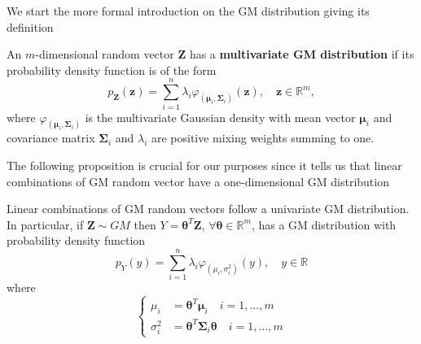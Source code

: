 We start the more formal introduction on the GM distribution giving its definition
\begin{definition}[GM distribution]
	An $m$-dimensional random vector $\bm{Z}$ has a \textbf{multivariate GM distribution} if its probability density function is of the form
	\[ p_{\bm{Z}}(\bm{z}) = \sum_{i=1}^{n} \lambda_i \varphi_{(\bm{\mu}_i,\bm{\Sigma}_i)}(\bm{z}), \quad \bm{z} \in \mathbb{R}^m, \] 
	where $\varphi_{(\bm{\mu}_i,\bm{\Sigma}_i)}$ is the multivariate Gaussian density with mean vector $\bm{\mu}_i$ and covariance matrix $\bm{\Sigma}_i$ and $\lambda_i$ are positive mixing weights summing to one.	
\end{definition}
The following proposition is crucial for our purposes since it tells us that linear combinations of GM random vector have a one-dimensional GM distribution
\begin{proposition}\label{prop:GM_lin_comb}
	Linear combinations of GM random vectors follow a univariate GM distribution. In particular, if $\bm{Z} \sim GM$ then $Y=\bm{\theta}^T \bm{Z}$,  $\forall \bm{\theta} \in \mathbb{R}^m$, has a GM distribution with probability density function \[ p_Y(y) = \sum_{i=1}^{n}\lambda_i \varphi_{(\mu_i,\sigma_i^2)}(y),\quad y \in \mathbb{R} \] where
	\[
	\begin{cases}
	\mu_i & = \bm{\theta}^T \bm{\mu}_i \quad i = 1,\ldots,m \\
	\sigma_i^2 & = \bm{\theta}^T \bm{\Sigma}_i \bm{\theta} \quad i = 1,\ldots,m
	\end{cases} \]
\end{proposition}
